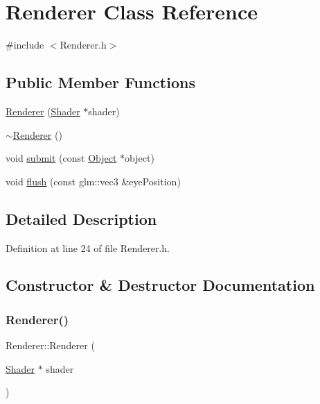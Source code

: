 \hypertarget{class_renderer}{}\section{Renderer Class Reference}
\label{class_renderer}


{\ttfamily \#include $<$Renderer.\+h$>$}

\subsection*{Public Member Functions}
\begin{DoxyCompactItemize}
\item 
\hyperlink{class_renderer_ab00d964ee94277771d706281d58dc5d6}{Renderer} (\hyperlink{class_shader}{Shader} $\ast$shader)
\item 
\hyperlink{class_renderer_afeee408862d5bd6255a6882d47e6d5cd}{$\sim$\+Renderer} ()
\item 
void \hyperlink{class_renderer_a51ce7e0195b0f751ad65a5f1fe0ad0c4}{submit} (const \hyperlink{class_object}{Object} $\ast$object)
\item 
void \hyperlink{class_renderer_a18316a088e902f0f737c345c860e997d}{flush} (const glm\+::vec3 \&eye\+Position)
\end{DoxyCompactItemize}


\subsection{Detailed Description}


Definition at line 24 of file Renderer.\+h.



\subsection{Constructor \& Destructor Documentation}
\mbox{\label{class_renderer_ab00d964ee94277771d706281d58dc5d6}} 
\subsubsection{\texorpdfstring{Renderer()}{Renderer()}}
{\footnotesize\ttfamily Renderer\+::\+Renderer (\begin{DoxyParamCaption}\item[{\hyperlink{class_shader}{Shader} $\ast$}]{shader }\end{DoxyParamCaption})}

